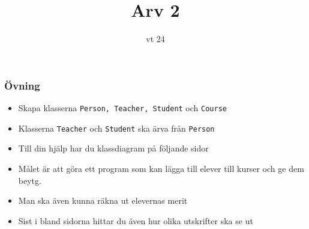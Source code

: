 \documentclass[aspectratio=169]{beamer}
\begin{document}


\title{Arv 2}
\date{vt 24}

\maketitle

\begin{frame}
	\frametitle{Övning}
	
	\begin{itemize}
		\item Skapa klasserna \texttt{Person, Teacher, Student} och \texttt{Course}
		\item Klasserna \texttt{Teacher} och \texttt{Student} ska ärva från \texttt{Person}
		\item Till din hjälp har du klassdiagram på följande sidor
		\item Målet är att göra ett program som kan lägga till elever till kurser och ge dem beytg.
		\item Man ska även kunna räkna ut elevernas merit
		\item Sist i bland sidorna hittar du även hur olika utskrifter ska se ut
	\end{itemize}
\end{frame}
\end{document}
